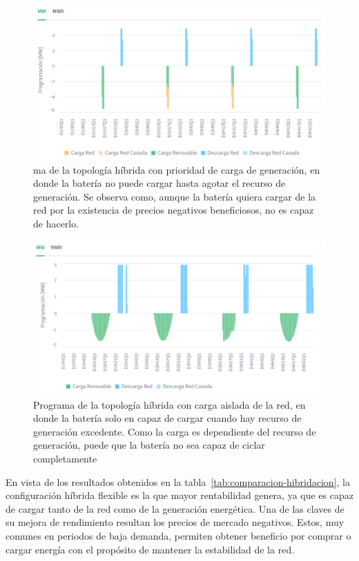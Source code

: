 \begin{figure}
  \centering
  \includegraphics[width=0.75\linewidth]{figures/hibrida-prioridad.png}
  \caption[Programa de la topología híbrida con prioridad de carga de generación.]{ma de la topología híbrida con prioridad de carga de generación, en donde la batería no puede cargar hasta agotar el recurso de generación. Se observa como, aunque la batería quiera cargar de la red por la existencia de precios negativos beneficiosos, no es capaz de hacerlo.}
  \label{fig:hibrida-prioridad}
\end{figure}

\begin{figure}
  \centering
  \includegraphics[width=0.75\linewidth]{figures/hibrida-aislada.png}
  \caption[Programa de la topología híbrida con carga aislada de la red.]{Programa de la topología híbrida con carga aislada de la red, en donde la batería solo en capaz de cargar cuando hay recurso de generación excedente. Como la carga es dependiente del recurso de generación, puede que la batería no sea capaz de ciclar completamente}
  \label{fig:hibrida-aislada}
\end{figure}

En vista de los resultados obtenidos en la tabla~\ref{tab:comparacion-hibridacion}, la configuración híbrida flexible es la que mayor rentabilidad genera, ya que es capaz de cargar tanto de la red como de la generación energética. Una de las claves de su mejora de rendimiento resultan los precios de mercado negativos. Estos, muy comunes en periodos de baja demanda, permiten obtener beneficio por comprar o cargar energía con el propósito de mantener la estabilidad de la red.

